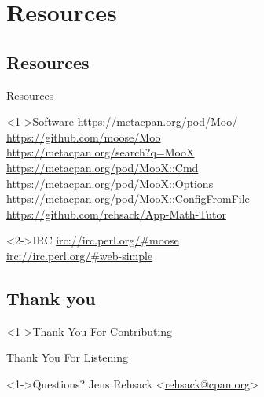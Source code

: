 \documentclass[ngerman,xcolor={table,dvipsnames},smaller,compress,hyperref={bookmarks,colorlinks}]{beamer}
\begin{document}



\section{Resources}

\subsection{Resources}

\begin{frame}[t,fragile]{Resources}
\begin{block}<1->{Software}
\url{https://metacpan.org/pod/Moo/} \\
\url{https://github.com/moose/Moo} \\
\url{https://metacpan.org/search?q=MooX} \\
\url{https://metacpan.org/pod/MooX::Cmd} \\
\url{https://metacpan.org/pod/MooX::Options} \\
\url{https://metacpan.org/pod/MooX::ConfigFromFile} \\
\url{https://github.com/rehsack/App-Math-Tutor}
\end{block}

\begin{block}<2->{IRC}
\url{irc://irc.perl.org/#moose} \\
\url{irc://irc.perl.org/#web-simple}
\end{block}
\end{frame}

\subsection{Thank you}

\begin{frame}[fragile]
\begin{block}<1->{Thank You For Contributing}
\begin{description}
\end{description}
\end{block}
\end{frame}

\begin{frame}[fragile]{Thank You For Listening}
\begin{block}<1->{Questions?}
Jens Rehsack \textless{}\href{mailto:rehsack@cpan.org}{rehsack@cpan.org}\textgreater{}
\end{block}
\end{frame}
\end{document}
